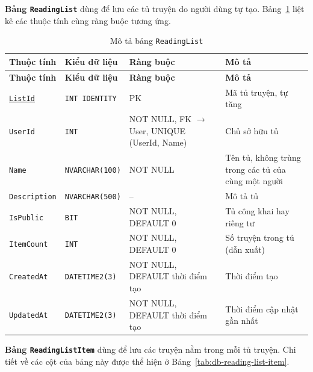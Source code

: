 \textbf{Bảng \texttt{ReadingList}} dùng để lưu các tủ truyện do người dùng tự tạo. Bảng~\ref{tab:db-reading-list} liệt kê các thuộc tính cùng ràng buộc tương ứng.


{\small
\renewcommand{\arraystretch}{1.2}
\begin{longtable}{|>{\raggedright\arraybackslash}p{3.1cm}|>{\raggedright\arraybackslash}p{2.7cm}|>{\raggedright\arraybackslash}p{4.0cm}|>{\raggedright\arraybackslash}p{5.4cm}|}
\caption{Mô tả bảng \texttt{ReadingList}}\label{tab:db-reading-list}\\
\hline
\textbf{Thuộc tính} & \textbf{Kiểu dữ liệu} & \textbf{Ràng buộc} & \textbf{Mô tả} \\ \hline
\endfirsthead
\hline
\textbf{Thuộc tính} & \textbf{Kiểu dữ liệu} & \textbf{Ràng buộc} & \textbf{Mô tả} \\ \hline
\endhead
\underline{\texttt{ListId}} & \texttt{INT IDENTITY} & PK & Mã tủ truyện, tự tăng \\ \hline
\texttt{UserId} & \texttt{INT} & NOT NULL, FK $\rightarrow$ User, UNIQUE (UserId, Name) & Chủ sở hữu tủ \\ \hline
\texttt{Name} & \texttt{NVARCHAR(100)} & NOT NULL & Tên tủ, không trùng trong các tủ của cùng một người \\ \hline
\texttt{Description} & \texttt{NVARCHAR(500)} & -- & Mô tả tủ \\ \hline
\texttt{IsPublic} & \texttt{BIT} & NOT NULL, DEFAULT 0 & Tủ công khai hay riêng tư \\ \hline
\texttt{ItemCount} & \texttt{INT} & NOT NULL, DEFAULT 0 & Số truyện trong tủ (dẫn xuất) \\ \hline
\texttt{CreatedAt} & \texttt{DATETIME2(3)} & NOT NULL, DEFAULT thời điểm tạo & Thời điểm tạo \\ \hline
\texttt{UpdatedAt} & \texttt{DATETIME2(3)} & NOT NULL, DEFAULT thời điểm tạo & Thời điểm cập nhật gần nhất \\ \hline
\end{longtable}
}

\textbf{Bảng \texttt{ReadingListItem}} dùng để lưu các truyện nằm trong mỗi tủ truyện. Chi tiết về các cột của bảng này được thể hiện ở Bảng~\ref{tab:db-reading-list-item}.


